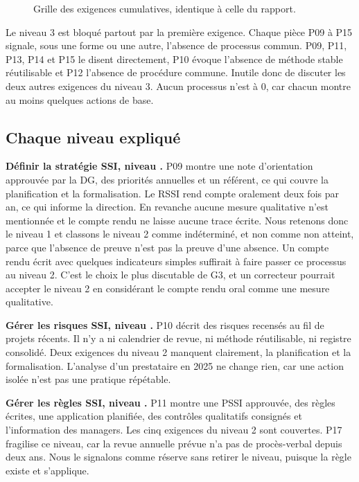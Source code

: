 \documentclass[11pt,a4paper]{article}
\begin{document}
\begin{figure}[H]
\centering
\resizebox{\linewidth}{!}{}
\caption{Grille des exigences cumulatives, identique à celle du rapport.}
\end{figure}

Le niveau 3 est bloqué partout par la première exigence. Chaque pièce P09 à P15 signale, sous une forme ou une autre, l'absence de processus commun. P09, P11, P13, P14 et P15 le disent directement, P10 évoque l'absence de méthode stable réutilisable et P12 l'absence de procédure commune. Inutile donc de discuter les deux autres exigences du niveau 3. Aucun processus n'est à 0, car chacun montre au moins quelques actions de base.

\subsection{Chaque niveau expliqué}

\textbf{Définir la stratégie SSI, niveau .} P09 montre une note d'orientation approuvée par la DG, des priorités annuelles et un référent, ce qui couvre la planification et la formalisation. Le RSSI rend compte oralement deux fois par an, ce qui informe la direction. En revanche aucune mesure qualitative n'est mentionnée et le compte rendu ne laisse aucune trace écrite. Nous retenons donc le niveau 1 et classons le niveau 2 comme indéterminé, et non comme non atteint, parce que l'absence de preuve n'est pas la preuve d'une absence. Un compte rendu écrit avec quelques indicateurs simples suffirait à faire passer ce processus au niveau 2. C'est le choix le plus discutable de G3, et un correcteur pourrait accepter le niveau 2 en considérant le compte rendu oral comme une mesure qualitative.

\textbf{Gérer les risques SSI, niveau .} P10 décrit des risques recensés au fil de projets récents. Il n'y a ni calendrier de revue, ni méthode réutilisable, ni registre consolidé. Deux exigences du niveau 2 manquent clairement, la planification et la formalisation. L'analyse d'un prestataire en 2025 ne change rien, car une action isolée n'est pas une pratique répétable.

\textbf{Gérer les règles SSI, niveau .} P11 montre une PSSI approuvée, des règles écrites, une application planifiée, des contrôles qualitatifs consignés et l'information des managers. Les cinq exigences du niveau 2 sont couvertes. P17 fragilise ce niveau, car la revue annuelle prévue n'a pas de procès-verbal depuis deux ans. Nous le signalons comme réserve sans retirer le niveau, puisque la règle existe et s'applique.
\end{document}
